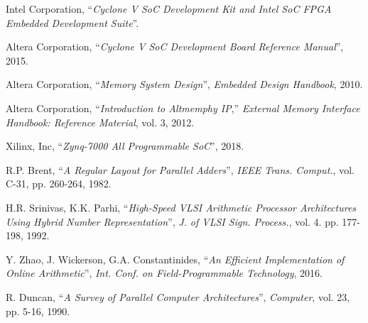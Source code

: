 \documentclass[journal]{IEEEtran}
\begin{document}
\begin{thebibliography}{1}

  Intel Corporation,
  ``\textit{Cyclone V SoC Development Kit and Intel SoC FPGA Embedded
  Development Suite}''.

  Altera Corporation,
  ``\textit{Cyclone V SoC Development Board Reference Manual}'',
  2015.

  Altera Corporation,
  ``\textit{Memory System Design}'',
  \textit{Embedded Design Handbook},
  2010.

  Altera Corporation,
  ``\textit{Introduction to Altmemphy IP},''
  \textit{External Memory Interface Handbook: Reference Material}, vol. 3,
  2012.

  Xilinx, Inc,
  ``\textit{Zynq-7000 All Programmable SoC}'',
  2018.

  R.P. Brent,
  ``\textit{A Regular Layout for Parallel Adders}'',
  \textit{IEEE Trans. Comput.}, vol. C-31, pp. 260-264,
  1982.

  H.R. Srinivas, K.K. Parhi,
  ``\textit{High-Speed VLSI Arithmetic Processor Architectures Using Hybrid
  Number Representation}'',
  \textit{J. of VLSI Sign. Process.}, vol. 4. pp. 177-198,
  1992.

  Y. Zhao, J. Wickerson, G.A. Constantinides,
  ``\textit{An Efficient Implementation of Online Arithmetic}'',
  \textit{Int. Conf. on Field-Programmable Technology},
  2016.

  R. Duncan,
  ``\textit{A Survey of Parallel Computer Architectures}'',
  \textit{Computer}, vol. 23, pp. 5-16,
  1990.


\end{thebibliography}
\end{document}
